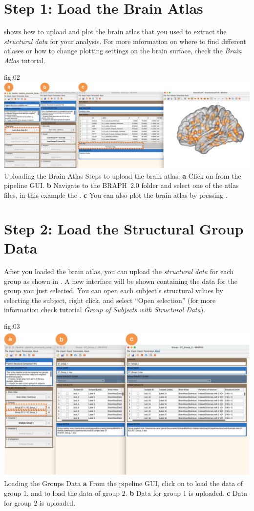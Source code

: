 \documentclass[justified]{tufte-handout}
\begin{document}
\section{Step 1: Load the Brain Atlas}
 shows how to upload and plot the brain atlas that you used to extract the \emph{structural data} for your analysis. For more information on where to find different atlases or how to change plotting settings on the brain surface, check the \emph{Brain Atlas} tutorial.

	{fig:02}
	{
	\includegraphics{fig02.jpg}
	}
	{Uploading the Brain Atlas}
	{
	Steps to upload the brain atlas:
	{\bf a} Click on  from the pipeline GUI.
	{\bf b} Navigate to the BRAPH~2.0 folder  and select one of the atlas files, in this example the . {\bf c} You can also plot the brain atlas by pressing . 
	}
 
\section{Step 2: Load the Structural Group Data}

After you loaded the brain atlas, you can upload the \emph{structural data} for each group as shown in . A new interface will be shown containing the data for the group you just selected. You can open each subject’s structural values by selecting
the subject, right click, and select “Open selection” (for more information check tutorial \emph{Group of Subjects with Structural Data}).
	
	{fig:03}
	{
	\includegraphics{fig03_medium.jpg}
	}
	{Loading the Groups Data}
	{
	{\bf a} From the pipeline GUI, click on  to load the data of group 1, and  to load the data of group 2.
	{\bf b} Data for group 1 is uploaded. {\bf c} Data for group 2 is uploaded.
	}
\end{document}
